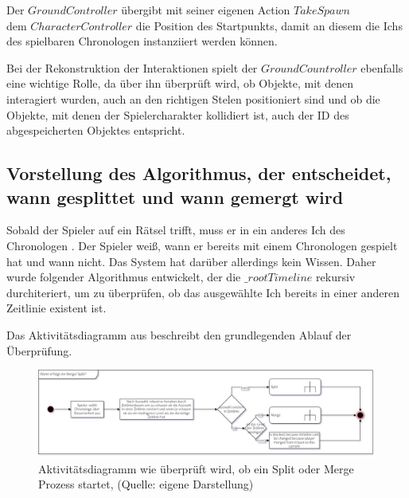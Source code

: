 Der $GroundController$ übergibt mit seiner eigenen Action $TakeSpawn$ \\ dem $CharacterController$ die Position des Startpunkts, damit an diesem die Ichs des spielbaren Chronologen instanziiert werden können.

Bei der Rekonstruktion der Interaktionen spielt der $GroundCountroller$ ebenfalls eine wichtige Rolle, da über ihn überprüft wird, ob Objekte, mit denen interagiert wurden, auch an den richtigen Stelen positioniert sind und ob die Objekte, mit denen der Spielercharakter kollidiert ist, auch der \ac{ID} des abgespeicherten Objektes entspricht.

\subsection{Vorstellung des Algorithmus, der entscheidet, wann gesplittet und wann gemergt wird}\label{sec:core_algo_split_merge}
Sobald der Spieler auf ein Rätsel trifft, muss er in ein anderes Ich des Chronologen . Der Spieler weiß, wann er bereits mit einem Chronologen gespielt hat und wann nicht. Das System hat darüber allerdings kein Wissen. Daher wurde folgender Algorithmus entwickelt, der die $\_rootTimeline$ rekursiv durchiteriert, um zu überprüfen, ob das ausgewählte Ich bereits in einer anderen Zeitlinie existent ist.

Das Aktivitätsdiagramm aus  beschreibt den grundlegenden Ablauf der Überprüfung.
\begin{figure}[ht]
\centering
\includegraphics[width=1\linewidth]{content/pictures/CheckIfSplit.jpg}
\caption{Aktivitätsdiagramm wie überprüft wird, ob ein Split oder Merge Prozess startet, (Quelle: eigene Darstellung)}
\label{fig:check-if-split-merge}
\end{figure}

